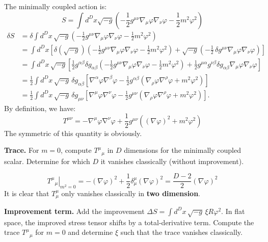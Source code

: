 \begin{solution}[25.3]
	The minimally coupled action is:
	\[
	S=\int d^Dx\sqrt{-g}\left(-\frac{1}{2}g^{\mu\nu}\nabla_\mu\varphi\nabla_\nu\varphi-\frac{1}{2}m^2\varphi^2\right)
	\]
	$$
	\begin{aligned}
		\delta S
		&=\delta\int d^Dx\,\sqrt{-g}\left(-\frac12 g^{\mu\nu}\nabla_\mu\varphi\nabla_\nu\varphi-\frac12 m^2\varphi^2\right)\\
		&=\int d^Dx\left[\delta(\sqrt{-g})\left(-\frac12 g^{\mu\nu}\nabla_\mu\varphi\nabla_\nu\varphi-\frac12 m^2\varphi^2\right)
		+\sqrt{-g}\left(-\frac12\,\delta g^{\mu\nu}\nabla_\mu\varphi\nabla_\nu\varphi\right)\right]\\
		&=\int d^Dx\,\sqrt{-g}\left[\frac12 g^{\alpha\beta}\delta g_{\alpha\beta}\left(-\frac12 g^{\mu\nu}\nabla_\mu\varphi\nabla_\nu\varphi-\frac12 m^2\varphi^2\right)
		+\frac12 g^{\mu\alpha}g^{\nu\beta}\delta g_{\alpha\beta}\nabla_\mu\varphi\nabla_\nu\varphi\right]\\
		&=\frac12\int d^Dx\,\sqrt{-g}\,\delta g_{\alpha\beta}\left[\nabla^\alpha\varphi\nabla^\beta\varphi-\frac12 g^{\alpha\beta}\left(\nabla_\rho\varphi\nabla^\rho\varphi+m^2\varphi^2\right)\right]\\
		&=\frac12\int d^Dx\,\sqrt{-g}\,\delta g_{\mu\nu}\left[\nabla^\mu\varphi\nabla^\nu\varphi-\frac12 g^{\mu\nu}\left(\nabla_\rho\varphi\nabla^\rho\varphi+m^2\varphi^2\right)\right].
	\end{aligned}
	$$
	By definition, we have:
	\[
	T^{\mu\nu}=-\nabla^\mu\varphi\operatorname{\nabla}^\nu\varphi+\frac{1}{2}g^{\mu\nu}{\left((\nabla\varphi)^2+m^2\varphi^2\right)}
	\]
	The symmetric of this quantity is obviously.
\end{solution}
\begin{problem}
    \textbf{Trace.} For \(m=0\), compute \(T^\mu{}_\mu\) in \(D\) dimensions for the minimally coupled scalar. Determine for which \(D\) it vanishes classically (without improvement).
\end{problem}
\begin{solution}[25.4]
	\[
	\left.{T^\mu}_\mu\right|_{m^2=0} = -(\nabla\varphi)^2+\frac12 \delta^\mu_\mu(\nabla\varphi)^2=\frac{D-2}{2}(\nabla\varphi)^2
	\]
	It is clear that $T^\mu_\mu$ only vanishes classically in \textbf{two dimension}.
\end{solution}
\begin{problem}
    \textbf{Improvement term.} Add the improvement \(\Delta S=\int d^Dx\,\sqrt{-g}\,\xi R\varphi^2\). In flat space, the improved stress tensor shifts by a total-derivative term. Compute the trace \(T^\mu{}_\mu\) for \(m=0\) and determine \(\xi\) such that the trace vanishes classically.
\end{problem}
